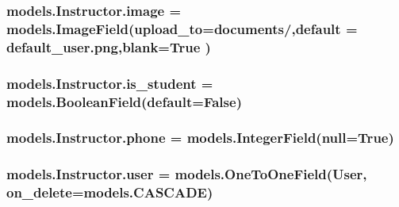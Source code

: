 \subsubsection[{\texorpdfstring{image}{image}}]{\setlength{\rightskip}{0pt plus 5cm}models.\+Instructor.\+image = models.\+Image\+Field(upload\+\_\+to=\textquotesingle{}documents/\textquotesingle{},default = \textquotesingle{}default\+\_\+user.\+png\textquotesingle{},blank=True )\hspace{0.3cm}{\ttfamily [static]}}\hypertarget{classmodels_1_1_instructor_ab6b343db0d24b97cb99f727597b52f94}{}\label{classmodels_1_1_instructor_ab6b343db0d24b97cb99f727597b52f94}
\subsubsection[{\texorpdfstring{is\+\_\+student}{is_student}}]{\setlength{\rightskip}{0pt plus 5cm}models.\+Instructor.\+is\+\_\+student = models.\+Boolean\+Field(default=False)\hspace{0.3cm}{\ttfamily [static]}}\hypertarget{classmodels_1_1_instructor_aa7ed2398a62decccb8795175fdbede0d}{}\label{classmodels_1_1_instructor_aa7ed2398a62decccb8795175fdbede0d}
\subsubsection[{\texorpdfstring{phone}{phone}}]{\setlength{\rightskip}{0pt plus 5cm}models.\+Instructor.\+phone = models.\+Integer\+Field(null=\textquotesingle{}True\textquotesingle{})\hspace{0.3cm}{\ttfamily [static]}}\hypertarget{classmodels_1_1_instructor_a85ca94a7dc5ad5e80a822d9e83f5aec0}{}\label{classmodels_1_1_instructor_a85ca94a7dc5ad5e80a822d9e83f5aec0}
\subsubsection[{\texorpdfstring{user}{user}}]{\setlength{\rightskip}{0pt plus 5cm}models.\+Instructor.\+user = models.\+One\+To\+One\+Field(User, on\+\_\+delete=models.\+C\+A\+S\+C\+A\+DE)\hspace{0.3cm}{\ttfamily [static]}}\hypertarget{classmodels_1_1_instructor_aed24718cc72d6650dead072556e1d73b}{}\label{classmodels_1_1_instructor_aed24718cc72d6650dead072556e1d73b}
